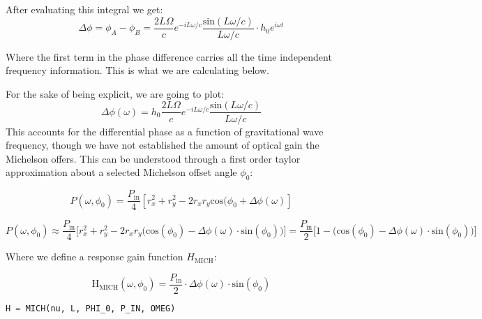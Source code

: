 \noindent After evaluating this integral we get: 
\begin{equation}
\Delta \phi=\phi_A - \phi_B = \frac{2 L \Omega}{c}e^{-i L \omega / c} \frac{\mathrm{sin}(L \omega /c)}{L \omega /c} \cdot h_0 e^{i \omega t}
\end{equation}

\noindent Where the first term in the phase difference carries all the time
independent frequency information. This is what we are calculating
below.

\noindent For the sake of being explicit, we are going to plot: 
\begin{equation}
\Delta \phi (\omega) = h_0\frac{2 L \Omega}{c}e^{-i L \omega / c} \frac{\mathrm{sin}(L \omega /c)}{L \omega /c}
\end{equation}This accounts for the differential phase as a function of
gravitational wave frequency, though we have not established the amount
of optical gain the Michelson offers. This can be understood through a
first order taylor approximation about a selected Michelson offset angle
\(\phi_0\):

\begin{equation}P(\omega, \phi_0) =  \frac{P_\mathrm{in}}{4} [r_x^2 + r_y^2 -  2r_x r_y\mathrm{cos}(\phi_0 + \Delta \phi (\omega)] \end{equation}

\begin{equation}P(\omega, \phi_0) \approx  \frac{P_\mathrm{in}}{4} \Big[ r_x^2 + r_y^2 -  2r_x r_y \big(\mathrm{cos}(\phi_0) - \Delta \phi(\omega) \cdot \mathrm{sin}(\phi_0) \big) \Big] =  \frac{P_\mathrm{in}}{2} \Big[1 - \big(\mathrm{cos}(\phi_0) - \Delta \phi(\omega) \cdot \mathrm{sin}(\phi_0) \big) \Big]\end{equation}

\noindent Where we define a response gain function \(H_\mathrm{MICH}\):

\begin{equation}\mathrm{H}_\mathrm{MICH}(\omega, \phi_0) =   \frac{P_\mathrm{in}}{2} \cdot \Delta \phi(\omega) \cdot \mathrm{sin}(\phi_0)\end{equation}

\begin{spacing}{1.2} \begin{lstlisting}[frame=single, language=Python]
H = MICH(nu, L, PHI_0, P_IN, OMEG)
\end{lstlisting} \end{spacing}


